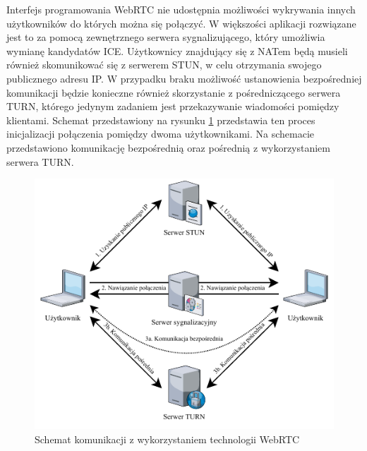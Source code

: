 \documentclass[language=polish,type=master]{aghmodern}
\begin{document}
Interfejs programowania WebRTC nie udostępnia możliwości wykrywania innych użytkowników do których można się połączyć.
W większości aplikacji rozwiązane jest to za pomocą zewnętrznego serwera sygnalizującego, który umożliwia wymianę kandydatów ICE\footnotemark{}.
Użytkownicy znajdujący się z NATem\footnotemark{} będą musieli również
skomunikować się z serwerem STUN\footnotemark{}, w celu otrzymania swojego publicznego adresu IP.
W przypadku braku możliwość ustanowienia bezpośredniej komunikacji będzie konieczne również skorzystanie z pośredniczącego serwera TURN\footnotemark{}, którego jedynym zadaniem jest przekazywanie wiadomości pomiędzy klientami.
Schemat przedstawiony na rysunku \ref{fig:webrtc} przedstawia ten proces inicjalizacji połączenia pomiędzy dwoma użytkownikami.
Na schemacie przedstawiono komunikację bezpośrednią oraz pośrednią z wykorzystaniem serwera TURN.

\begin{figure}[H]
    \centering
    \vspace*{15pt}
    \includegraphics[width=\textwidth]{images/webrtc.pdf}
    \caption{Schemat komunikacji z wykorzystaniem technologii WebRTC}
    \label{fig:webrtc}
\end{figure}
\end{document}
